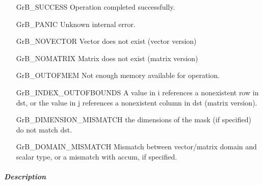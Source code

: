 \begin{itemize}[leftmargin=2.1in]
\item[{\sf GrB\_SUCCESS}]             Operation completed successfully.
\item[{\sf GrB\_PANIC}]               Unknown internal error.
\item[{\sf GrB\_NOVECTOR}]            Vector does not exist (vector version)
\item[{\sf GrB\_NOMATRIX}]            Matrix does not exist (matrix version)
\item[{\sf GrB\_OUTOFMEM}]            Not enough memory available for operation.
\item[{\sf GrB\_INDEX\_OUTOFBOUNDS}]
        A value in i references a nonexistent row in dst, or
        the value in j references a nonexistent column in dst (matrix version).
\item[{\sf GrB\_DIMENSION\_MISMATCH}] 
        the dimensions of the mask (if specified) do not match dst.
\item[{\sf GrB\_DOMAIN\_MISMATCH}]    Mismatch between vector/matrix domain and scalar type,
                                      or a mismatch with {\sf accum}, if specified.
\end{itemize}


\subparagraph{Description}
